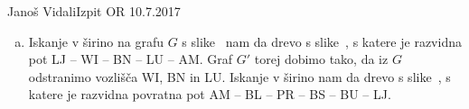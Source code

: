 \begin{naloga}{Janoš Vidali}{Izpit OR 10.7.2017}
\begin{odgovor}
\begin{enumerate}[(a)]
\item Iskanje v širino na grafu $G$ s slike~\fig
nam da drevo s slike~,
s katere je razvidna pot LJ -- WI -- BN -- LU -- AM.
Graf $G'$ torej dobimo tako, da iz $G$ odstranimo vozlišča WI, BN in LU.
Iskanje v širino nam da drevo s slike~,
s katere je razvidna povratna pot AM -- BL -- PR -- BS -- BU -- LJ.
\end{enumerate}
%
\begin{slika}[p]
\end{slika}
%
\begin{slika}[p]
\end{slika}
\end{odgovor}
\end{naloga}
